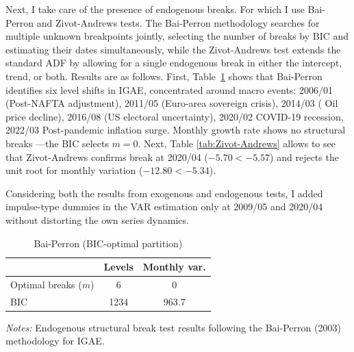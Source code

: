 \documentclass[12pt]{article}
\begin{document}
Next, I take care of the presence of endogenous breaks. For which I use Bai-Perron and Zivot-Andrews tests. The Bai-Perron methodology searches for multiple unknown breakpoints
jointly, selecting the number of breaks by BIC and estimating their dates simultaneously, while the Zivot-Andrews test extends the standard ADF by allowing for
a single endogenous break in either the intercept, trend, or both. 
 Results are as follows. First, Table~\ref{tab:Bai-Perron} shows that Bai-Perron identifies six level shifts in IGAE, concentrated around macro events: 2006/01 (Post-NAFTA adjustment), 2011/05 (Euro-area sovereign crisis), 2014/03 ( Oil price decline), 2016/08 (US electoral uncertainty), 2020/02 COVID-19 recession, 2022/03 Post-pandemic inflation surge. Monthly growth rate shows no structural breaks ---the BIC selects $m = 0$. Next, Table \ref{tab:Zivot-Andrews} allows to see that Zivot-Andrews confirms break at 2020/04 ($-5.70 < -5.57$) and rejects the unit root for monthly variation ($-12.80 < -5.34$). 

Considering both the results from exogenous and endogenous tests, I added impulse-type dummies in the VAR estimation only at 2009/05 and 2020/04 without distorting the own series dynamics. 

\begin{table}[H]
\centering
\begin{threeparttable}
\caption{Bai-Perron (BIC-optimal partition)}\label{tab:Bai-Perron}
\begin{tabular}{lcc}
\hline
 & \textbf{Levels} & \textbf{Monthly var.} \\
\hline
Optimal breaks ($m$) & 6 & 0 \\
BIC & 1234 & 963.7 \\
\hline
\end{tabular}
\begin{tablenotes}
    \small
    \item \textit{Notes:} Endogenous structural break test results following the Bai-Perron (2003) methodology for IGAE. %
\end{tablenotes}

\end{threeparttable}
\end{table}
\end{document}
